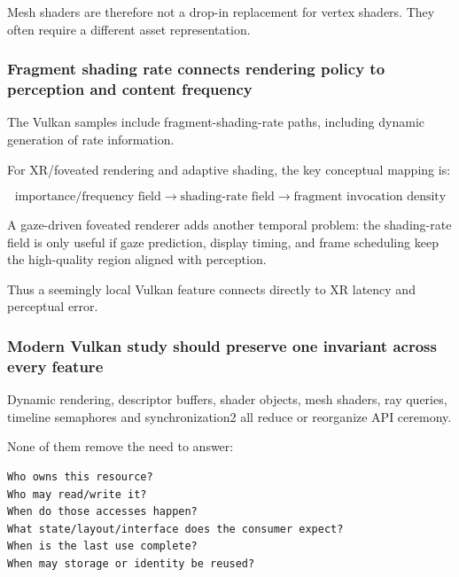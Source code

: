 Mesh shaders are therefore not a drop-in replacement for vertex shaders. They often require a different asset representation.

\subsubsection{Fragment shading rate connects rendering policy to perception and content frequency}\label{05-engine-i-ch023-fragment-shading-rate-connects-rendering-policy-to-perception-and-content-frequency}

\hypertarget{05-engine-i-ch023-fragment-shading-rate-connects-rendering-policy-to-perception-and-content-frequency}{}

The Vulkan samples include fragment-shading-rate paths, including dynamic generation of rate information.

For XR/foveated rendering and adaptive shading, the key conceptual mapping is:

\[
\text{importance/frequency field}
\rightarrow
\text{shading-rate field}
\rightarrow
\text{fragment invocation density}
\]

A gaze-driven foveated renderer adds another temporal problem: the shading-rate field is only useful if gaze prediction, display timing, and frame scheduling keep the high-quality region aligned with perception.

Thus a seemingly local Vulkan feature connects directly to XR latency and perceptual error.

\subsubsection{Modern Vulkan study should preserve one invariant across every feature}\label{05-engine-i-ch023-modern-vulkan-study-should-preserve-one-invariant-across-every-feature}

\hypertarget{05-engine-i-ch023-modern-vulkan-study-should-preserve-one-invariant-across-every-feature}{}

Dynamic rendering, descriptor buffers, shader objects, mesh shaders, ray queries, timeline semaphores and synchronization2 all reduce or reorganize API ceremony.

None of them remove the need to answer:

\begin{verbatim}
Who owns this resource?
Who may read/write it?
When do those accesses happen?
What state/layout/interface does the consumer expect?
When is the last use complete?
When may storage or identity be reused?
\end{verbatim}

